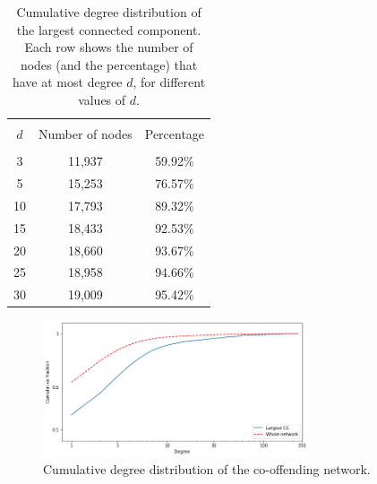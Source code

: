 \documentclass[11pt, english]{article}
\begin{document}
\begin{multicols}{2}
\begin{table}
	\caption{Cumulative degree distribution of the largest connected component. Each row shows the number of nodes (and the percentage) that have at most degree $d$, for different values of $d$.}
	\label{tab:cumulative-degree-distribution-CC}
	\centering
	\begin{tabular}{ccc}
		\hline\hline
		\\[-1.5ex]
		$d$		&	Number of nodes	&	Percentage	\\[0.5ex]\hline
		\\[-1.5ex]
		3		&	11,937			&	59.92\%		\\[0.2ex]
		5		&	15,253			&	76.57\%		\\[0.2ex]
		10		&	17,793			&	89.32\%		\\[0.2ex]
		15		&	18,433			&	92.53\%		\\[0.2ex]
		20		&	18,660			&	93.67\%		\\[0.2ex]
		25		&	18,958			&	94.66\%		\\[0.2ex]
		30		&	19,009			&	95.42\%		\\[0.5ex]
		\hline\hline
	\end{tabular}
\end{table}

\begin{figure}
	\caption{Cumulative degree distribution of the co-offending network.}
	\centering
	\label{fig:cumulative-degree-distribution-CC}
	\includegraphics[width=0.7\textwidth]{cumulative-degree-distribution-CC}
\end{figure}


\end{multicols}
\end{document}
